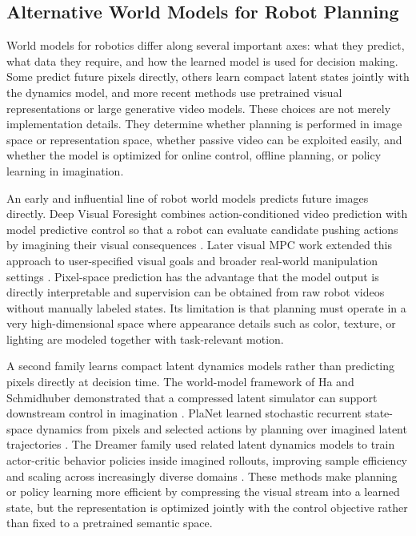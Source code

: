 \documentclass[12pt]{report}
\begin{document}
\subsection{Alternative World Models for Robot Planning}
World models for robotics differ along several important axes: what they predict, what data they require, and how the learned model is used for decision making. Some predict future pixels directly, others learn compact latent states jointly with the dynamics model, and more recent methods use pretrained visual representations or large generative video models. These choices are not merely implementation details. They determine whether planning is performed in image space or representation space, whether passive video can be exploited easily, and whether the model is optimized for online control, offline planning, or policy learning in imagination.

An early and influential line of robot world models predicts future images directly. Deep Visual Foresight combines action-conditioned video prediction with model predictive control so that a robot can evaluate candidate pushing actions by imagining their visual consequences \cite{finn2016visualforesight}. Later visual MPC work extended this approach to user-specified visual goals and broader real-world manipulation settings \cite{ebert2018visualforesight}. Pixel-space prediction has the advantage that the model output is directly interpretable and supervision can be obtained from raw robot videos without manually labeled states. Its limitation is that planning must operate in a very high-dimensional space where appearance details such as color, texture, or lighting are modeled together with task-relevant motion.

A second family learns compact latent dynamics models rather than predicting pixels directly at decision time. The world-model framework of Ha and Schmidhuber demonstrated that a compressed latent simulator can support downstream control in imagination \cite{ha2018worldmodels}. PlaNet learned stochastic recurrent state-space dynamics from pixels and selected actions by planning over imagined latent trajectories \cite{hafner2019planet}. The Dreamer family used related latent dynamics models to train actor-critic behavior policies inside imagined rollouts, improving sample efficiency and scaling across increasingly diverse domains \cite{hafner2019dreamer,hafner2020dreamerv2,hafner2023dreamerv3}. These methods make planning or policy learning more efficient by compressing the visual stream into a learned state, but the representation is optimized jointly with the control objective rather than fixed to a pretrained semantic space.
\end{document}
